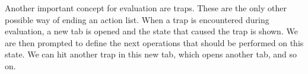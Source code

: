 \documentclass{report}
\begin{document}
Another important concept for evaluation are traps. These are the only other possible way of ending an action list.
When a trap is encountered during evaluation, a new tab is opened and the state that caused the trap is shown.
We are then prompted to define the next operations that should be performed on this state.
We can hit another trap in this new tab, which opens another tab, and so on.
\end{document}
